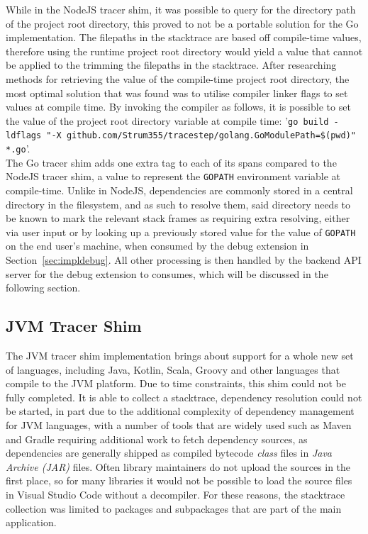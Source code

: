 \documentclass[12pt,pdftex,titlepage]{report}
\begin{document}
                While in the NodeJS tracer shim, it was possible to query for the directory path of the project root directory, this proved to not be a portable solution for the Go implementation. The filepaths
                in the stacktrace are based off compile-time values, therefore using the runtime project root directory would yield a value that cannot be applied to the trimming the filepaths in the stacktrace. 
                After researching methods for retrieving the value of the compile-time project root directory, the most optimal solution that was found was to utilise compiler linker flags to set values at compile
                time\cite{golangldflag}. By invoking the compiler as follows, it is possible to set the value of the project root directory variable at compile time: '\texttt{go build -ldflags "-X 
                github.com/Strum355/tracestep/golang.GoModulePath=\$(pwd)" *.go}'.\\ The Go tracer shim adds one extra tag to each of its spans compared to the NodeJS tracer shim, a value to represent the 
                \texttt{GOPATH} environment variable at compile-time. Unlike in NodeJS, dependencies are commonly stored in a central directory in the filesystem, and as such to resolve them, said directory needs to
                be known to mark the relevant stack frames as requiring extra resolving, either via user input or by looking up a previously stored value for the value of \texttt{GOPATH} on the end user's machine,
                when consumed by the debug extension in Section~\ref{sec:impldebug}. All other processing is then handled by the backend API server for the debug extension to consumes, which will be discussed in the 
                following section.

            \subsection{JVM Tracer Shim}
                The JVM tracer shim implementation brings about support for a whole new set of languages, including Java, Kotlin, Scala, Groovy and other languages that compile to the JVM platform. Due to time 
                constraints, this shim could not be fully completed. It is able to collect a stacktrace, dependency resolution could not be started, in part due to the additional complexity of dependency management
                for JVM languages, with a number of tools that are widely used such as Maven and Gradle requiring additional work to fetch dependency sources, as dependencies are generally shipped as compiled bytecode 
                \textit{class} files in \textit{Java Archive (JAR)} files. Often library maintainers do not upload the sources in the first place, so for many libraries it would not be possible to load the source files
                in Visual Studio Code without a decompiler. For these reasons, the stacktrace collection was limited to packages and subpackages that are part of the main application.
\end{document}
